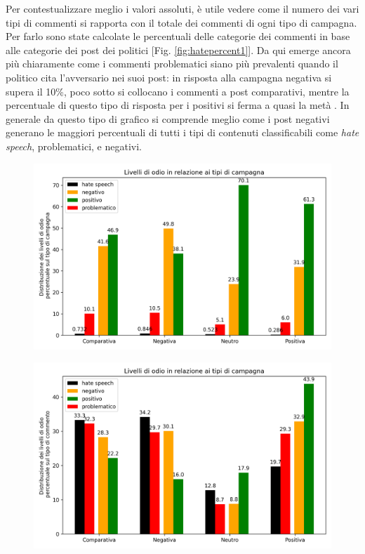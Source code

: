 Per contestualizzare meglio i valori assoluti, è utile vedere come il numero dei vari tipi di commenti si rapporta con il totale dei commenti di ogni tipo di campagna. Per farlo sono state calcolate le percentuali delle categorie dei commenti in base alle categorie dei post dei politici [Fig. \ref{fig:hatepercent1}]. Da qui emerge ancora più chiaramente come i commenti problematici siano più prevalenti quando il politico cita l'avversario nei suoi post: in risposta alla campagna negativa si supera il 10\%, poco sotto si collocano i commenti a post comparativi, mentre la percentuale di questo tipo di risposta per i positivi si ferma a quasi la metà . In generale da questo tipo di grafico si comprende meglio come i post negativi generano le maggiori percentuali di tutti i tipi di contenuti classificabili come \textit{hate speech}, problematici, e negativi.
\begin{figure}
	\centering
	\begin{minipage}{.5\textwidth}
		\centering
		\includegraphics[width=\linewidth]{figures/hatepercent1}
		\label{fig:hatepercent1}
	\end{minipage}%
	\begin{minipage}{.5\textwidth}
		\centering
		\includegraphics[width=\linewidth]{figures/hatepercent}
		\label{fig:hatepercent}
	\end{minipage}
\end{figure}
